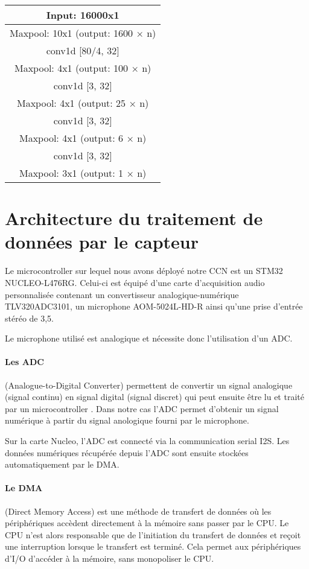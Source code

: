 \begin{center}
  \begin{tabular}{ |c|}
   \hline
    Input: 16000x1\\
   \hline
    Maxpool: 10x1 (output: 1600 × n)\\
   \hline
    conv1d [80/4, 32]\\
   \hline
    Maxpool: 4x1 (output: 100 × n)\\
   \hline
    conv1d [3, 32]\\
   \hline
    Maxpool: 4x1 (output: 25 × n)\\
   \hline
    conv1d [3, 32]\\
   \hline
    Maxpool: 4x1 (output: 6 × n)\\
   \hline
    conv1d [3, 32]\\
   \hline
    Maxpool: 3x1 (output: 1 × n)\\
   \hline
  \end{tabular}
\end{center}

\section{Architecture du traitement de données par le capteur}
Le microcontroller sur lequel nous avons déployé notre CCN est un STM32 NUCLEO-L476RG.
Celui-ci est équipé d'une carte d'acquisition audio personnalisée 
contenant un convertisseur analogique-numérique TLV320ADC3101, un 
microphone AOM-5024L-HD-R ainsi qu'une prise d'entrée stéréo de 3,5.

Le microphone utilisé est analogique et nécessite donc l'utilisation d'un ADC.

\paragraph{Les ADC} (Analogue-to-Digital Converter) permettent de convertir un signal analogique (signal continu) en signal digital (signal discret)
qui peut ensuite être lu et traité par un microcontroller \cite{ADC}. Dans notre cas l'ADC permet d'obtenir un signal numérique à partir du signal anologique
fourni par le microphone.

Sur la carte Nucleo, l'ADC est connecté via la communication serial I2S. Les données numériques récupérée depuis l'ADC sont ensuite stockées automatiquement par le DMA.

\paragraph{Le DMA} (Direct Memory Access) est une méthode de transfert de données où les périphériques accèdent directement à la mémoire sans passer par le CPU.
Le CPU n'est alors responsable que de l'initiation du transfert de données et reçoit une interruption lorsque le transfert est terminé.
Cela permet aux périphériques d'I/O d'accéder à la mémoire, sans monopoliser le CPU. \cite{DMA}

